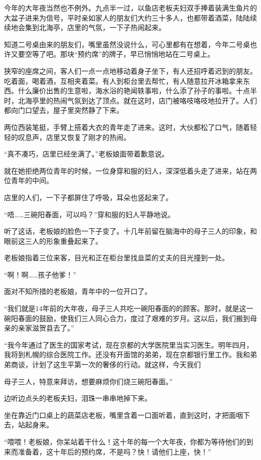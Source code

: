 \documentclass[UTF8,a4paper,8pt]{ctexart}
\begin{document}
 今年的大年夜当然也不例外。九点半一过，以鱼店老板夫妇双手捧着装满生鱼片的大盆子进来为信号，平时亲如家人的朋友们大约三十多人，也都带着酒菜，陆陆续续地会集到北海亭，店里的气氛，一下子热闹起来。
 
 知道二号桌由来的朋友们，嘴里虽然没说什么，可心里都有在想着，今年二号桌也许又要空等了吧。那块“预约席”的牌子，早已悄悄地站在二号桌上。
 
 狭窄的座席之间，客人们一点一点地移动着身子坐下，有人还招呼着迟到的朋友。吃着面，喝着酒，互相夹着菜。有人到柜台里去帮忙，有人随意拉开冰箱拿来东西。什么廉价出售的生意啦，海水浴的艳闻轶事啦，什么添了孙子的事啦。十点半时，北海亭里的热闹气氛到达了顶点。就在这时，店门被咯吱咯吱地拉开了。人们都向门口望去，屋子里突然静了下来。
 
 两位西装笔挺，手臂上搭着大衣的青年走了进来。这时，大伙都松了口气，随着轻轻的叹息声，店里又恢复了刚才的热闹。
 
 “真不凑巧，店里已经坐满了。”老板娘面带着歉意说。
 
 就在她拒绝两位青年的时候，一位身穿和服的妇人，深深低着头走了进来，站在两位青年的中间。
 
 店里的人们，一下子都屏住了呼吸，耳朵也竖起来了。
 
 “唔……三碗阳春面，可以吗？”穿和服的妇人平静地说。
 
 听了这话，老板娘的脸色一下子变了。十几年前留在脑海中的母子三人的印象，和眼前这三人的形象重叠起来了。
 
 老板娘指着三位来客，目光和正在柜台里找韭菜的丈夫的目光撞到一处。
 
 “啊！啊……孩子他爹！”
 
 面对不知所措的老板娘，青年中的一位开口了。
 
 “我们就是14年前的大年夜，母子三人共吃一碗阳春面的的顾客。那时，就是这一碗阳春面的鼓励，使我们三人同心合力，度过了艰难的岁月。这以后，我们搬到母亲的亲家滋贺县去了。”
 
 “我今年通过了医生的国家考试，现在京都的大学医院里当实习医生。明年四月，我将到札幌的综合医院工作。还没有开面馆的弟弟，现在京都银行里工作。我和弟弟商谈，计划了这生平第一次的奢侈的行动。就这样，今天我们
 
 母子三人，特意来拜访，想要麻烦你们烧三碗阳春面。”
 
 边听边点头的老板夫妇，泪珠一串串地掉下来。
 
 坐在靠近门口桌上的蔬菜店老板，嘴里含着一口面听着，直到这时，才把面咽下去，站起身来。
 
 “喂喂！老板娘，你呆站着干什么！这十年的每一个大年夜，你都为等待他们的到来而准备着，这十年后的预约席，不是吗？快！请他们上座，快！”
 
\end{document}
